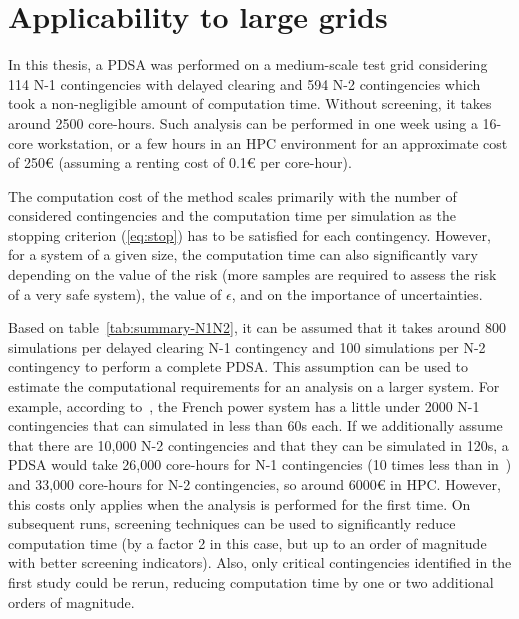
\section{Applicability to large grids}
\label{sec:PDSA_scalability}


In this thesis, a PDSA was performed on a medium-scale test grid considering 114 N-1 contingencies with delayed clearing and 594 N-2 contingencies which took a non-negligible amount of computation time. Without screening, it takes around 2500 core-hours. Such analysis can be performed in one week using a 16-core workstation, or a few hours in an HPC environment for an approximate cost of 250€ (assuming a renting cost of 0.1€ per core-hour).

The computation cost of the method scales primarily with the number of considered contingencies and the computation time per simulation as the stopping criterion (\ref{eq:stop}) has to be satisfied for each contingency. However, for a system of a given size, the computation time can also significantly vary depending on the value of the risk (more samples are required to assess the risk of a very safe system), the value of \(\epsilon\), and on the importance of uncertainties.

Based on table~\ref{tab:summary-N1N2}, it can be assumed that it takes around 800 simulations per delayed clearing N-1 contingency and 100 simulations per N-2 contingency to perform a complete PDSA. This assumption can be used to estimate the computational requirements for an analysis on a larger system. For example, according to~\cite{EurostagHPC}, the French power system has a little under 2000 N-1 contingencies that can simulated in less than 60s each. If we additionally assume that there are 10,000 N-2 contingencies and that they can be simulated in 120s, a PDSA would take 26,000 core-hours for N-1 contingencies (10 times less than in~\cite{EurostagHPC}) and 33,000 core-hours for N-2 contingencies, so around 6000€ in HPC. However, this costs only applies when the analysis is performed for the first time. On subsequent runs, screening techniques can be used to significantly reduce computation time (by a factor 2 in this case, but up to an order of magnitude with better screening indicators). Also, only critical contingencies identified in the first study could be rerun, reducing computation time by one or two additional orders of magnitude.

